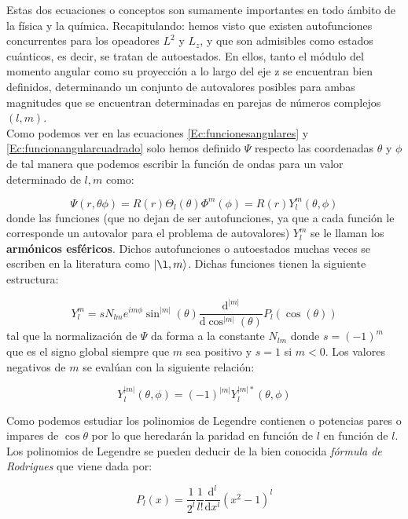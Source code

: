 \documentclass[12pt,a4paper]{article}
\numberwithin{equation}{section}
\numberwithin{figure}{section}
\newcommand{\D}{\mathrm{d}}
\newcommand{\derivadas}[2]{\frac{\D #1}{\D #2}}
\begin{document}
Estas dos ecuaciones o conceptos son sumamente importantes en todo ámbito de la física y la química. Recapitulando: hemos visto que existen autofunciones concurrentes para los opeadores $L^2$ y $L_z$, y que son admisibles como estados cuánticos, es decir, se tratan de autoestados. En ellos, tanto el módulo del momento angular como su proyección a lo largo del eje z se encuentran bien definidos, determinando un conjunto de autovalores posibles para ambas magnitudes que se encuentran determinadas en parejas de números complejos $(l,m)$. \\

Como podemos ver en las ecuaciones \ref{Ec:funcionesangulares} y \ref{Ec:funcionangularcuadrado} solo hemos definido $\Psi$ respecto las coordenadas $\theta$ y $\phi$ de tal manera que podemos escribir la función de ondas para un valor determinado de $l,m$ como:

\begin{equation}
\Psi (r,\theta\phi)=R(r)\Theta_l(\theta)\Phi^m(\phi) = R(r) Y_l^m (\theta, \phi)
\end{equation}
donde las funciones (que no dejan de ser autofunciones, ya que a cada función le corresponde un autovalor para el problema de autovalores) $Y_l^m$ se le llaman los \textbf{armónicos esféricos}. Dichos autofunciones o autoestados muchas veces se escriben en la literatura como $| \l, m \rangle$. Dichas funciones tienen la siguiente estructura:

\begin{equation}
Y_l^m = s N_{lm} e^{im \phi} \sin^{|m|} (\theta) \derivadas{^{|m|}}{\cos^{|m|} (\theta)} P_ l (\cos (\theta))
\end{equation}
tal que la normalización de $\Psi$ da forma a la constante $N_{lm}$ donde $s=(-1)^m$ que es el signo global siempre que $m$ sea positivo y $s=1$ si $m<0$. Los valores negativos de $m$ se evalúan con la siguiente relación:

\begin{equation}
Y_l^{|m|} (\theta,\phi)= (-1)^{|m|} Y_l^{|m|*} (\theta, \phi)
\end{equation}

Como podemos estudiar los polinomios de Legendre contienen o potencias pares o impares de $\cos \theta$ por lo que heredarán la paridad en función de $l$ en función de $l$. Los polinomios de Legendre se pueden deducir de la bien conocida \textit{fórmula de Rodrigues} que viene dada por:

\begin{equation}
P_l (x) = \dfrac{1}{2^l} \dfrac{1}{l!} \derivadas{^l}{x^l} (x^2-1)^l
\end{equation}
\end{document}
